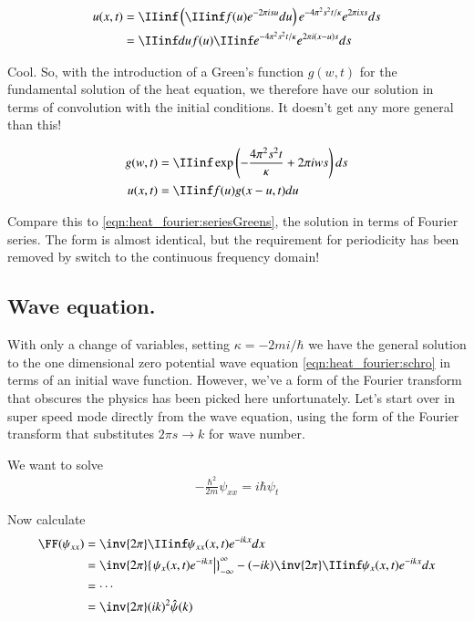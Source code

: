 \begin{align*}
u(x,t) 
&= 
\IIinf \left( 
\IIinf f(u) e^{-2 \pi i s u } du \right) e^{ -4 \pi^2 s^2 t/ \kappa } e^{2 \pi i x s } ds  \\
&= 
\IIinf du f(u) 
\IIinf e^{ -4 \pi^2 s^2 t/ \kappa } e^{2 \pi i (x - u) s } ds  \\
\end{align*}

Cool.  So, with the introduction of a Green's function $g(w,t)$ for the fundamental solution of the heat equation, we therefore have our solution in terms of convolution with the initial conditions.  It doesn't get any more general than this!

\begin{align}
g(w,t) &= 
\IIinf \exp\left( -\frac{4 \pi^2 s^2 t}{\kappa} + 2 \pi i w s \right) ds \\
u(x,t) &= \IIinf f(u) g( x - u, t) du
\end{align}

Compare this to \ref{eqn:heat_fourier:seriesGreens}, the solution in terms of Fourier series.  The form is almost identical, but the requirement for periodicity has been removed by switch to the continuous frequency domain!

\subsection{Wave equation. }

With only a change of variables, setting $\kappa = - 2 m i /\hbar$ we have the general solution to the one dimensional zero potential wave equation \ref{eqn:heat_fourier:schro} in terms of an initial wave function.  However, we've a form of the Fourier transform that obscures the physics has been picked here unfortunately.  Let's start over in super speed mode directly from the wave equation, using the form of the Fourier transform that substitutes $2\pi s \rightarrow k$ for wave number.

We want to solve
\begin{align*}
-\frac{\hbar^2}{2m} \psi_{xx} = i \hbar \psi_t
\end{align*}

Now calculate
\begin{align*}
\FF(\psi_{xx}) 
&= \inv{2\pi} \IIinf \psi_{xx}(x,t) e^{-i k x} dx \\
&= 
\inv{2\pi} {\left.\psi_{x}(x,t) e^{-i k x} \right\vert}_{-\infty}^\infty 
-(- i k) \inv{2\pi} \IIinf \psi_{x}(x,t) e^{-i k x} dx \\
&= \cdots \\
&= \inv{2\pi} (i k)^2 \hat{\psi}(k)
\end{align*}

